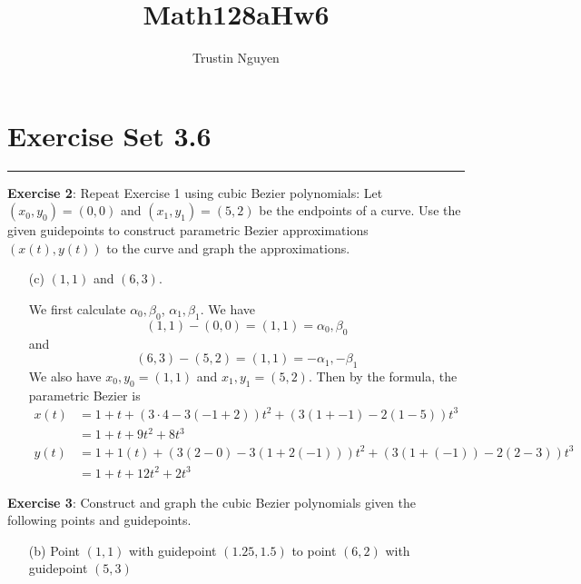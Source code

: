 \documentclass{article}
\title{Math128aHw6}
\author{Trustin Nguyen}
\begin{document}
    \maketitle

\reversemarginpar

\section*{Exercise Set 3.6}
\hrule

\textbf{Exercise 2}: Repeat Exercise 1 using cubic Bezier polynomials: Let $(x_{0}, y_{0}) = (0, 0)$ and $(x_{1}, y_{1}) = (5, 2)$ be the endpoints of a curve. Use the given guidepoints to construct parametric Bezier approximations $(x(t), y(t))$ to the curve and graph the approximations.
    \begin{itemize}
        \item [(c)] $(1, 1)$ and $(6, 3)$.
            \begin{answer}
                We first calculate $\alpha_{0}, \beta_{0}$, $\alpha_{1}, \beta_{1}$. We have
                    \begin{equation*}
                        (1, 1) - (0, 0) = (1, 1) = \alpha_{0}, \beta_{0}
                    \end{equation*}
                and
                    \begin{equation*}
                        (6, 3) - (5, 2) = (1, 1) = -\alpha_{1}, -\beta_{1}
                    \end{equation*}
                We also have $x_{0}, y_{0} = (1, 1)$ and $x_{1}, y_{1} = (5, 2)$. Then by the formula, the parametric Bezier is
                    \begin{align*}
                        x(t) &= 1 + t + (3 \cdot 4 - 3(-1 + 2))t^{2} + (3(1 + -1) - 2(1 - 5))t^{3}        \\
                             &= 1 + t + 9t^{2} + 8t^{3}                                                   \\
                        y(t) &= 1 + 1(t) + (3(2 - 0) - 3(1 + 2(-1)))t^{2} + (3(1 + (-1)) - 2(2 - 3))t^{3} \\
                             &= 1 + t + 12t^{2} + 2t^{3}                                                    
                    \end{align*}
            \end{answer}
    \end{itemize}

\textbf{Exercise 3}: Construct and graph the cubic Bezier polynomials given the following points and guidepoints.
    \begin{itemize}
        \item [(b)] Point $(1, 1)$ with guidepoint $(1.25, 1.5)$ to point $(6, 2)$ with guidepoint $(5, 3)$
        \begin{fixedfigure}
        \end{fixedfigure}
    \end{itemize}
\end{document}
